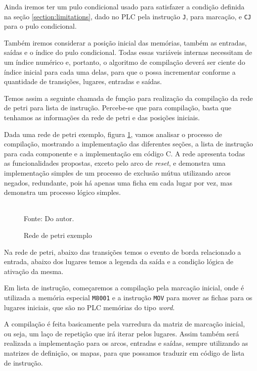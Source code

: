 Ainda iremos ter um pulo condicional usado para satisfazer a condição definida na seção \ref{section:limitations}, dado no PLC pela instrução \lstinline{J}, para marcação, e \lstinline{CJ} para o pulo condicional.

Também iremos considerar a posição inicial das memórias, também as entradas, saídas e o índice do pulo condicional. Todas essas variáveis internas necessitam de um índice numérico e, portanto, o algoritmo de compilação deverá ser ciente do índice inicial para cada uma delas, para que o possa incrementar conforme a quantidade de transições, lugares, entradas e saídas. 

Temos assim a seguinte chamada de função para realização da compilação da rede de petri para lista de instrução. Percebe-se que para compilação, basta que tenhamos as informações da rede de petri e das posições iniciais.



Dada uma rede de petri exemplo, figura \ref{fig:pnetcomp}, vamos analisar o processo de compilação, mostrando a implementação das diferentes seções, a lista de instrução para cada componente e a implementação em código C. A rede apresenta todas as funcionalidades propostas, exceto pelo arco de \textit{reset}, e demonstra uma implementação simples de um processo de exclusão mútua utilizando arcos negados, redundante, pois há apenas uma ficha em cada lugar por vez, mas demonstra um processo lógico simples. 

\begin{figure}[ht]
	\centering
	\caption{Rede de petri exemplo}
	\\
	\label{fig:pnetcomp}
	\footnotesize{Fonte: Do autor.}
\end{figure}

Na rede de petri, abaixo das transições temos o evento de borda relacionado a entrada, abaixo dos lugares temos a legenda da saída e a condição lógica de ativação da mesma.

Em lista de instrução, começaremos a compilação pela marcação inicial, onde é utilizada a memória especial \lstinline{M8001} e a instrução \lstinline{MOV} para mover as fichas para os lugares iniciais, que são no PLC memórias do tipo \textit{word}.

A compilação é feita basicamente pela varredura da matriz de marcação inicial, ou seja, um laço de repetição que irá iterar pelos lugares. Assim também será realizada a implementação para os arcos, entradas e saídas, sempre utilizando as matrizes de definição, os mapas, para que possamos traduzir em código de lista de instrução.

